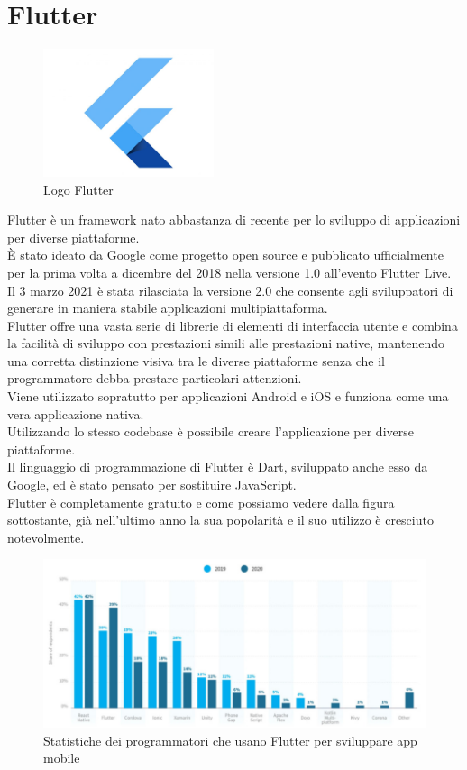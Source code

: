 \section{Flutter}
\begin{figure}[htbp]	
	\centering
	\includegraphics[width=5cm]{immagini/flutterlogo.jpg}
	\caption{Logo Flutter}
	\label{fig:Logo Flutter}
\end{figure}
Flutter \cite{flutter,flutterprogramma,fluttermobile} è un framework nato abbastanza di recente per lo sviluppo di applicazioni per diverse piattaforme.\\
È stato ideato da Google come progetto open source e pubblicato ufficialmente per la prima volta a dicembre del 2018 nella versione 1.0 all'evento Flutter Live.\\
Il 3 marzo 2021 è stata rilasciata la versione 2.0 che consente agli sviluppatori di generare in maniera stabile applicazioni multipiattaforma.\\
Flutter offre una vasta serie di librerie di elementi di interfaccia utente e combina la facilità di sviluppo con prestazioni simili alle prestazioni native, mantenendo una corretta distinzione visiva tra le diverse piattaforme senza che il programmatore debba prestare particolari attenzioni.\\
Viene utilizzato sopratutto per applicazioni Android e iOS e funziona come una vera applicazione nativa.\\
Utilizzando lo stesso codebase è possibile creare l'applicazione per diverse piattaforme.\\
Il linguaggio di programmazione di Flutter è Dart, sviluppato anche esso da Google, ed è stato pensato per sostituire JavaScript.\\
Flutter è completamente gratuito e come possiamo vedere dalla figura sottostante, già nell'ultimo anno la sua popolarità e il suo utilizzo è cresciuto notevolmente.\\
\begin{figure}[htbp]	
	\centering
	\includegraphics[width=13cm]{immagini/statisticheflutter.png}
	\caption{Statistiche dei programmatori che usano Flutter per sviluppare app mobile}
	\label{fig:Statistiche dei programmatori che usano Flutter per sviluppare app mobile}
\end{figure}
